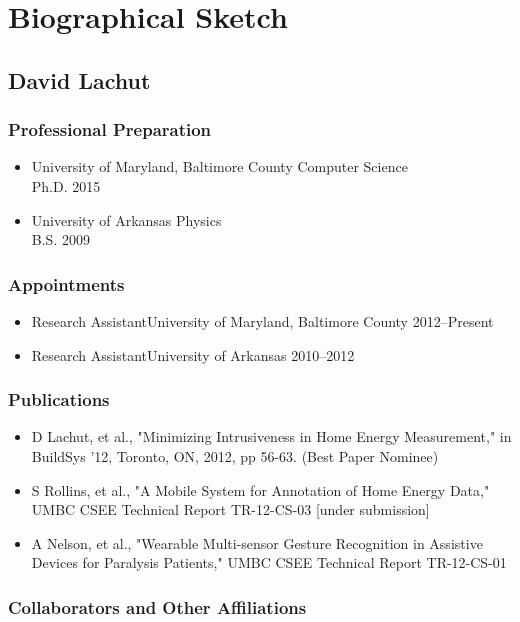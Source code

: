 \section{Biographical Sketch}
  \subsection{David Lachut}
    \subsubsection{Professional Preparation}
      \begin{itemize}
        \item University of Maryland, Baltimore County \hfill Computer Science
	  \\ Ph.D. 2015
	\item University of Arkansas \hfill Physics 
	  \\ B.S. 2009
      \end{itemize}
    \subsubsection{Appointments}
      \begin{itemize}
        \item Research Assistant\hfill University of Maryland, Baltimore County
2012--Present
        \item Research Assistant\hfill University of Arkansas \hspace{105pt}
2010--2012
      \end{itemize}

    \subsubsection{Publications}
      \begin{itemize}
	\item D Lachut, et al., "Minimizing Intrusiveness in Home Energy
	  Measurement," in BuildSys '12, Toronto, ON, 2012, pp 56-63. (Best
	  Paper Nominee)
        \item S Rollins, et al., "A Mobile System for Annotation of Home
	  Energy Data," UMBC CSEE Technical Report TR-12-CS-03 [under
	  submission]
        \item A Nelson, et al., "Wearable Multi-sensor Gesture Recognition in
	  Assistive Devices for Paralysis Patients," UMBC CSEE Technical Report
	  TR-12-CS-01
      \end{itemize}
    \subsubsection{Collaborators and Other Affiliations}
